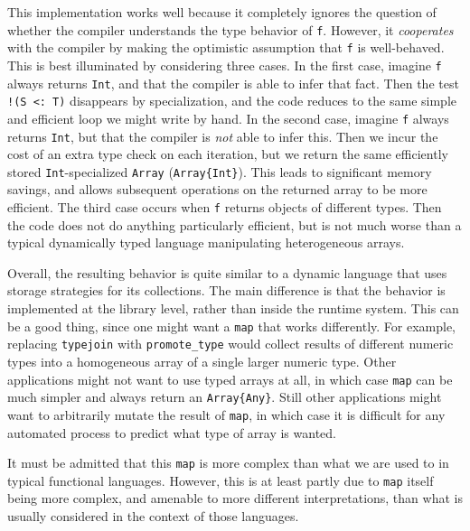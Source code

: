 This implementation works well because it completely ignores the
question of whether the compiler understands the type behavior of
\texttt{f}.
However, it \emph{cooperates} with the compiler by making the
optimistic assumption that \texttt{f} is well-behaved.
This is best illuminated by considering three cases.
In the first case, imagine \texttt{f} always returns \texttt{Int},
and that the compiler is able to infer that fact.
Then the test \texttt{!(S <:\ T)} disappears by specialization,
and the code reduces to the same simple and efficient loop we
might write by hand.
In the second case, imagine \texttt{f} always returns \texttt{Int},
but that the compiler is \emph{not} able to infer this.
Then we incur the cost of an extra type check on each iteration,
but we return the same efficiently stored \texttt{Int}-specialized
\texttt{Array} (\texttt{Array\{Int\}}).
This leads to significant memory savings, and allows subsequent
operations on the returned array to be more efficient.
The third case occurs when \texttt{f} returns objects of different
types.
Then the code does not do anything particularly efficient, but is
not much worse than a typical dynamically typed language manipulating
heterogeneous arrays.

Overall, the resulting behavior is quite similar to a dynamic
language that uses storage strategies \cite{Bolz2013} for its
collections.
The main difference is that the behavior is implemented at the
library level, rather than inside the runtime system.
This can be a good thing, since one might want a \texttt{map} that
works differently.
For example, replacing \texttt{typejoin} with \texttt{promote\_type}
would collect results of different numeric types into a
homogeneous array of a single larger numeric type.
Other applications might not want to use typed arrays at all, in
which case \texttt{map} can be much simpler and always return an
\texttt{Array\{Any\}}.
Still other applications might want to arbitrarily mutate the result
of \texttt{map}, in which case it is difficult for any automated
process to predict what type of array is wanted.

It must be admitted that this \texttt{map} is more complex than
what we are used to in typical functional languages.
However, this is at least partly due to \texttt{map} itself
being more complex, and amenable to more different interpretations,
than what is usually considered in the context of those languages.



